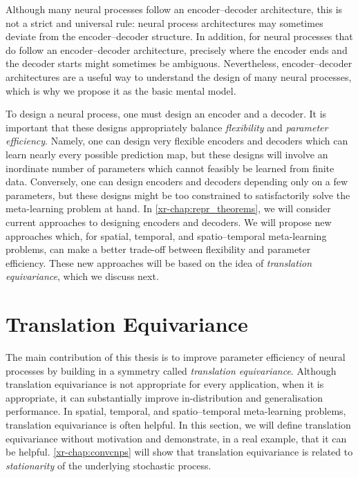 \documentclass[12pt, twoside]{report}
\newcommand{\xrprefix}[1]{xr-#1}
\begin{document}
Although many neural processes follow an encoder--decoder architecture, this is not a strict and universal rule:
neural process architectures may sometimes deviate from the encoder--decoder structure.
In addition, for neural processes that do follow an encoder--decoder architecture,
precisely where the encoder ends and the decoder starts might sometimes be ambiguous.
Nevertheless, encoder--decoder architectures are a useful way to understand the design of many neural processes, which is why we propose it as the basic mental model.

To design a neural process, one must design an encoder and a decoder.
It is important that these designs appropriately balance \emph{flexibility} and \emph{parameter efficiency}.
Namely, one can design very flexible encoders and decoders which can learn nearly every possible prediction map, but these designs will involve an inordinate number of parameters which cannot feasibly be learned from finite data.
Conversely, one can design encoders and decoders depending only on a few parameters, but these designs might be too constrained to satisfactorily solve the meta-learning problem at hand.
In \cref{\xrprefix{chap:repr_theorems}}, we will consider current approaches to designing encoders and decoders.
We will propose new approaches which, for spatial, temporal, and spatio--temporal meta-learning problems, can make a better trade-off between flexibility and parameter efficiency.
These new approaches will be based on the idea of \emph{translation equivariance}, which we discuss next.

\section{Translation Equivariance}
\label{sec:nps:translation_equivariance}

The main contribution of this thesis is to improve parameter efficiency of neural processes by building in a symmetry called 
\emph{translation equivariance}.
Although translation equivariance is not appropriate for every application,
when it is appropriate, it can substantially improve in-distribution and generalisation performance.
In spatial, temporal, and spatio--temporal meta-learning problems, translation equivariance is often helpful.
In this section, we will define translation equivariance without motivation
and demonstrate, in a real example, that it can be helpful.
\cref{\xrprefix{chap:convcnps}} will show that translation equivariance is related to \emph{stationarity} of the underlying stochastic process.
\end{document}
